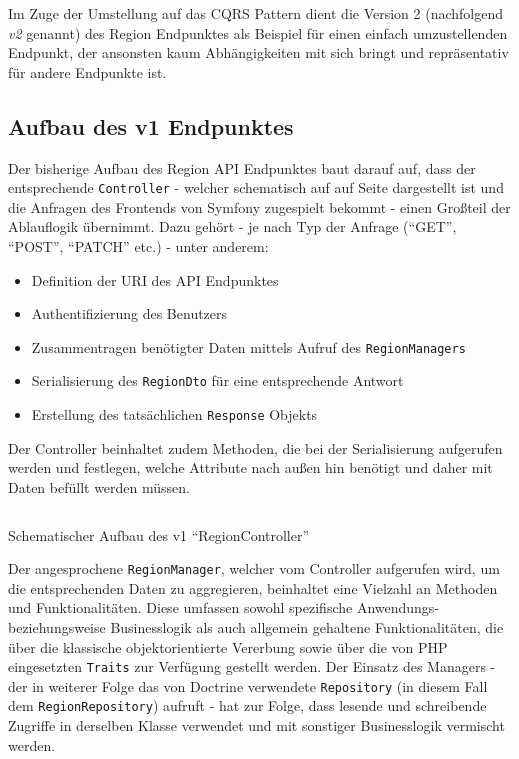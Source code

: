 \documentclass[a4paper,12pt,twoside]{scrreprt}
\begin{document}
\smallskip

Im Zuge der Umstellung auf das CQRS Pattern dient die Version 2 (nachfolgend \textit{v2} genannt) des Region Endpunktes als Beispiel für einen einfach umzustellenden Endpunkt, der ansonsten kaum Abhängigkeiten mit sich bringt und repräsentativ für andere Endpunkte ist.

\subsection{Aufbau des v1 Endpunktes}
\label{sub-sec:region-aufbau-v1}
Der bisherige Aufbau des Region API Endpunktes baut darauf auf, dass der entsprechende \texttt{Controller} - welcher schematisch auf auf Seite \pageref{code:region-controller-v1} dargestellt ist und die Anfragen des Frontends von Symfony zugespielt bekommt - einen Großteil der Ablauflogik übernimmt. Dazu gehört - je nach Typ der Anfrage (\enquote{GET}, \enquote{POST}, \enquote{PATCH} etc.) - unter anderem:

\begin{itemize}
    \item Definition der URI des API Endpunktes
    \item Authentifizierung des Benutzers
    \item Zusammentragen benötigter Daten mittels Aufruf des \texttt{RegionManagers}
    \item Serialisierung des \texttt{RegionDto} für eine entsprechende Antwort
    \item Erstellung des tatsächlichen \texttt{Response} Objekts
\end{itemize}

\noindent Der Controller beinhaltet zudem Methoden, die bei der Serialisierung aufgerufen werden und festlegen, welche Attribute nach außen hin benötigt und daher mit Daten befüllt werden müssen.

\begin{listing}[ht]
    \inputminted[fontsize=\footnotesize,linenos,breaklines]{php}{code/region_controller_v1.php}
    \caption[Schematischer Aufbau des v1 \enquote{RegionController}]{Schematischer Aufbau des v1 \enquote{RegionController}}
    \label{code:region-controller-v1}
\end{listing}

\smallskip

Der angesprochene \texttt{RegionManager}, welcher vom Controller aufgerufen wird, um die entsprechenden Daten zu aggregieren, beinhaltet eine Vielzahl an Methoden und Funktionalitäten. Diese umfassen sowohl spezifische Anwendungs- beziehungsweise Businesslogik als auch allgemein gehaltene Funktionalitäten, die über die klassische objektorientierte Vererbung sowie über die von PHP eingesetzten \texttt{Traits} zur Verfügung gestellt werden. Der Einsatz des Managers - der in weiterer Folge das von Doctrine verwendete \texttt{Repository} (in diesem Fall dem \texttt{RegionRepository}) aufruft - hat zur Folge, dass lesende und schreibende Zugriffe in derselben Klasse verwendet und mit sonstiger Businesslogik vermischt werden.
\end{document}
